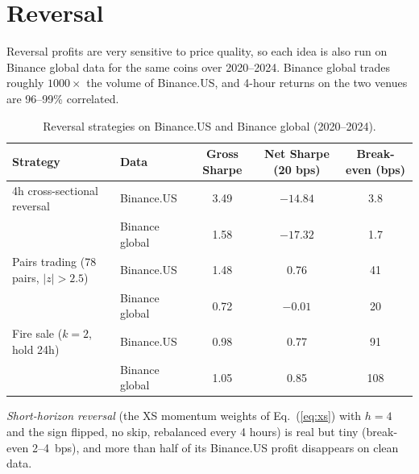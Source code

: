 \documentclass[aps,prl,onecolumn,superscriptaddress,nofootinbib]{revtex4-2}
\begin{document}
	\section{Reversal}
	\label{app:reversal}
	
	Reversal profits are very sensitive to price quality, so each idea is also run on Binance global data for the same coins over 2020--2024. Binance global trades roughly $1000\times$ the volume of Binance.US, and 4-hour returns on the two venues are 96--99\% correlated.
	
	\begin{table}[h]
		\caption{Reversal strategies on Binance.US and Binance global (2020--2024).}
		\label{tab:reversal}
		\begin{ruledtabular}
			\begin{tabular}{llccc}
				Strategy & Data & Gross Sharpe & Net Sharpe (20 bps) & Break-even (bps) \\
				\hline
				4h cross-sectional reversal          & Binance.US     & 3.49 & $-14.84$ & 3.8 \\
				& Binance global & 1.58 & $-17.32$ & 1.7 \\
				Pairs trading (78 pairs, $|z| > 2.5$) & Binance.US     & 1.48 & 0.76     & 41 \\
				& Binance global & 0.72 & $-0.01$  & 20 \\
				Fire sale ($k = 2$, hold 24h)        & Binance.US     & 0.98 & 0.77     & 91 \\
				& Binance global & 1.05 & 0.85     & 108 \\
			\end{tabular}
		\end{ruledtabular}
	\end{table}
	
	\textit{Short-horizon reversal} (the XS momentum weights of Eq.~(\ref{eq:xs}) with $h = 4$ and the sign flipped, no skip, rebalanced every 4 hours) is real but tiny (break-even 2--4~bps), and more than half of its Binance.US profit disappears on clean data.
	
\end{document}
